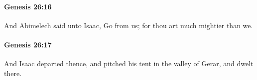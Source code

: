 		\paragraph{Genesis 26:16} %
			\label{GENESIS-26-16}

			And Abimelech said unto Isaac, Go from us; for thou art much mightier than we.


		\paragraph{Genesis 26:17} %
			\label{GENESIS-26-17}

			And Isaac departed thence, and pitched his tent in the valley of Gerar, and dwelt there.


